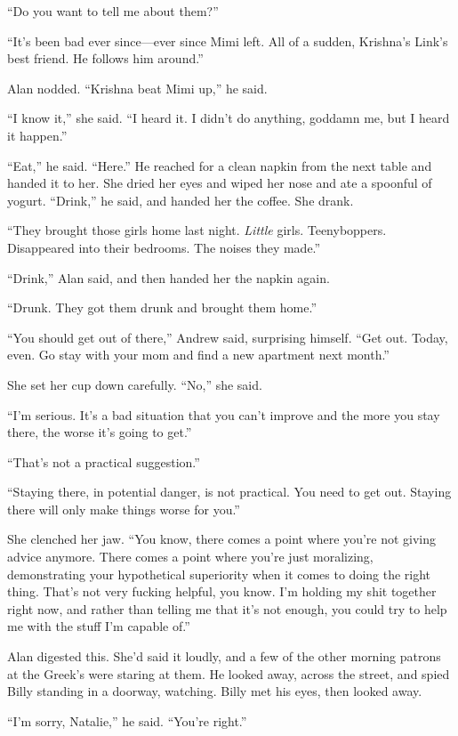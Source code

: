 \documentclass{article}
\begin{document}
``Do you want to tell me about them?''

``It's been bad ever since---ever since Mimi left.  All of a sudden,
Krishna's Link's best friend.  He follows him around.''

Alan nodded.  ``Krishna beat Mimi up,'' he said. 

``I know it,'' she said.  ``I heard it.  I didn't do anything, goddamn
me, but I heard it happen.''

``Eat,'' he said.  ``Here.'' He reached for a clean napkin from the
next table and handed it to her.  She dried her eyes and wiped her
nose and ate a spoonful of yogurt.  ``Drink,'' he said, and handed her
the coffee.  She drank.

``They brought those girls home last night.  \textit{Little} girls. 
Teenyboppers.  Disappeared into their bedrooms.  The noises they
made.''

``Drink,'' Alan said, and then handed her the napkin again.

``Drunk.  They got them drunk and brought them home.''

``You should get out of there,'' Andrew said, surprising himself. 
``Get out.  Today, even.  Go stay with your mom and find a new
apartment next month.''

She set her cup down carefully.  ``No,'' she said.

``I'm serious.  It's a bad situation that you can't improve and the
more you stay there, the worse it's going to get.''

``That's not a practical suggestion.''

``Staying there, in potential danger, is not practical.  You need to
get out.  Staying there will only make things worse for you.''

She clenched her jaw.  ``You know, there comes a point where you're
not giving advice anymore.  There comes a point where you're just
moralizing, demonstrating your hypothetical superiority when it comes
to doing the right thing.  That's not very fucking helpful, you know. 
I'm holding my shit together right now, and rather than telling me
that it's not enough, you could try to help me with the stuff I'm
capable of.''

Alan digested this.  She'd said it loudly, and a few of the other
morning patrons at the Greek's were staring at them.  He looked away,
across the street, and spied Billy standing in a doorway, watching. 
Billy met his eyes, then looked away.

``I'm sorry, Natalie,'' he said.  ``You're right.''
\end{document}
